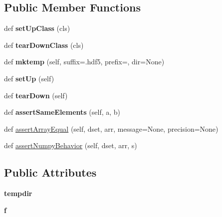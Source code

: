 \subsection*{Public Member Functions}
\begin{DoxyCompactItemize}
\item 
\mbox{\label{classh5py__LOCAL_1_1tests_1_1common_1_1TestCase_adc65f7e8c0b14b2e7cc39c02c2522e8c}} 
def {\bfseries set\+Up\+Class} (cls)
\item 
\mbox{\label{classh5py__LOCAL_1_1tests_1_1common_1_1TestCase_ad68b227379041a73f8045888a3147b97}} 
def {\bfseries tear\+Down\+Class} (cls)
\item 
\mbox{\label{classh5py__LOCAL_1_1tests_1_1common_1_1TestCase_a849e16e410c6000e9e6f906602bebfb4}} 
def {\bfseries mktemp} (self, suffix=\textquotesingle{}.hdf5\textquotesingle{}, prefix=\textquotesingle{}\textquotesingle{}, dir=None)
\item 
\mbox{\label{classh5py__LOCAL_1_1tests_1_1common_1_1TestCase_ab16cdff0f0c625171b143a5595337374}} 
def {\bfseries set\+Up} (self)
\item 
\mbox{\label{classh5py__LOCAL_1_1tests_1_1common_1_1TestCase_a975cd319f3a70020a969ad6690ea791b}} 
def {\bfseries tear\+Down} (self)
\item 
\mbox{\label{classh5py__LOCAL_1_1tests_1_1common_1_1TestCase_aa7438679aa3773de8fda4f8e84435007}} 
def {\bfseries assert\+Same\+Elements} (self, a, b)
\item 
def \hyperlink{classh5py__LOCAL_1_1tests_1_1common_1_1TestCase_a4048c84ae90d454d0545ca1def1f4326}{assert\+Array\+Equal} (self, dset, arr, message=None, precision=None)
\item 
def \hyperlink{classh5py__LOCAL_1_1tests_1_1common_1_1TestCase_aae2a888455d3593a87623e41e0a838a7}{assert\+Numpy\+Behavior} (self, dset, arr, s)
\end{DoxyCompactItemize}
\subsection*{Public Attributes}
\begin{DoxyCompactItemize}
\item 
\mbox{\label{classh5py__LOCAL_1_1tests_1_1common_1_1TestCase_a3097303391ce019c15238e5223dc39fe}} 
{\bfseries tempdir}
\item 
\mbox{\label{classh5py__LOCAL_1_1tests_1_1common_1_1TestCase_a871b4536ef7c8908a995f4ea924325c7}} 
{\bfseries f}
\end{DoxyCompactItemize}


